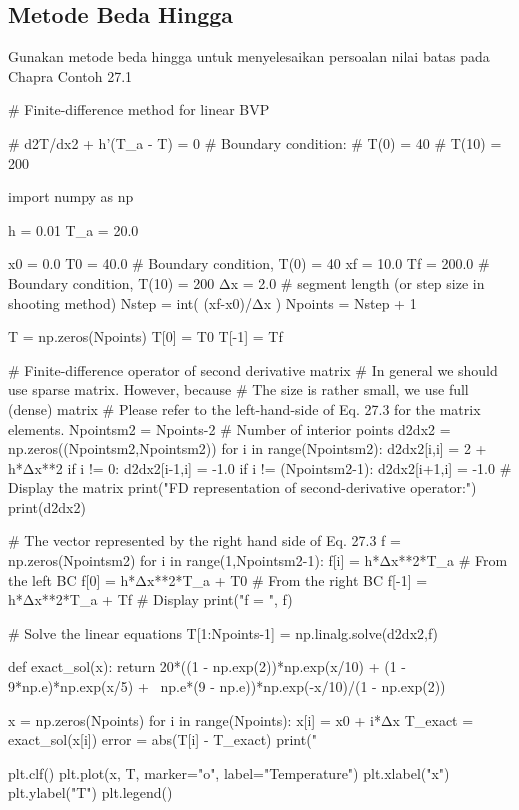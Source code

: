 \subsection{Metode Beda Hingga}

\begin{soal}
Gunakan metode beda hingga untuk menyelesaikan persoalan nilai
batas pada Chapra Contoh 27.1
\end{soal}

\begin{pythoncode}
# Finite-difference method for linear BVP

# d2T/dx2 + h'(T_a - T) = 0
# Boundary condition:
#   T(0) = 40
#   T(10) = 200

import numpy as np

h = 0.01
T_a = 20.0

x0 = 0.0
T0 = 40.0 # Boundary condition, T(0) = 40
xf = 10.0
Tf = 200.0 # Boundary condition, T(10) = 200
Δx = 2.0 # segment length (or step size in shooting method)
Nstep = int( (xf-x0)/Δx )
Npoints = Nstep + 1

T = np.zeros(Npoints)
T[0] = T0
T[-1] = Tf

# Finite-difference operator of second derivative matrix
# In general we should use sparse matrix. However, because
# The size is rather small, we use full (dense) matrix
# Please refer to the left-hand-side of Eq. 27.3 for the matrix elements.
Npointsm2 = Npoints-2 # Number of interior points
d2dx2 =  np.zeros((Npointsm2,Npointsm2))
for i in range(Npointsm2):
    d2dx2[i,i] = 2 + h*Δx**2
    if i != 0:
        d2dx2[i-1,i] = -1.0
    if i != (Npointsm2-1):
        d2dx2[i+1,i] = -1.0
# Display the matrix
print("FD representation of second-derivative operator:")
print(d2dx2)

# The vector represented by the right hand side of Eq. 27.3
f = np.zeros(Npointsm2)
for i in range(1,Npointsm2-1):
    f[i] = h*Δx**2*T_a
# From the left BC
f[0] = h*Δx**2*T_a + T0
# From the right BC 
f[-1] = h*Δx**2*T_a + Tf
# Display
print("f = ", f)

# Solve the linear equations
T[1:Npoints-1] = np.linalg.solve(d2dx2,f)

def exact_sol(x):
    return 20*((1 - np.exp(2))*np.exp(x/10) + (1 - 9*np.e)*np.exp(x/5) + \
            np.e*(9 - np.e))*np.exp(-x/10)/(1 - np.exp(2))

x = np.zeros(Npoints)
for i in range(Npoints):
    x[i] = x0 + i*Δx
    T_exact = exact_sol(x[i])
    error = abs(T[i] - T_exact)
    print("%

plt.clf()
plt.plot(x, T, marker="o", label="Temperature")
plt.xlabel("x")
plt.ylabel("T")
plt.legend()
\end{pythoncode}

